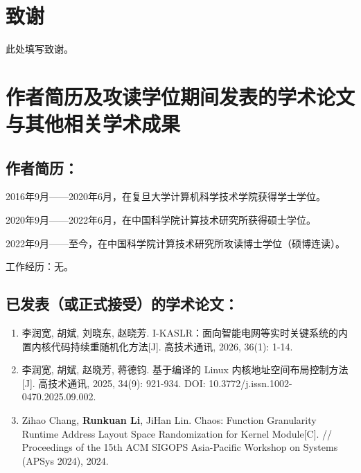 \chapter[致谢]{致\quad 谢}%

此处填写致谢。


\chapter{作者简历及攻读学位期间发表的学术论文与其他相关学术成果}

\section*{作者简历：}
2016年9月——2020年6月，在复旦大学计算机科学技术学院获得学士学位。

2020年9月——2022年6月，在中国科学院计算技术研究所获得硕士学位。

2022年9月——至今，在中国科学院计算技术研究所攻读博士学位（硕博连读）。

工作经历：无。%

\section*{已发表（或正式接受）的学术论文：}

{
\setlist[enumerate]{}%
\begin{enumerate}[nosep]
    \item 李润宽, 胡斌, 刘晓东, 赵晓芳. I-KASLR：面向智能电网等实时关键系统的内置内核代码持续重随机化方法[J]. 高技术通讯, 2026, 36(1): 1-14.
    \item 李润宽, 胡斌, 赵晓芳, 蒋德钧. 基于编译的 Linux 内核地址空间布局控制方法[J]. 高技术通讯, 2025, 34(9): 921-934. DOI: 10.3772/j.issn.1002-0470.2025.09.002.
    \item Zihao Chang, \textbf{Runkuan Li}, JiHan Lin. Chaos: Function Granularity Runtime Address Layout Space Randomization for Kernel Module[C]. // Proceedings of the 15th ACM SIGOPS Asia-Pacific Workshop on Systems (APSys 2024), 2024.%
\end{enumerate}
}

